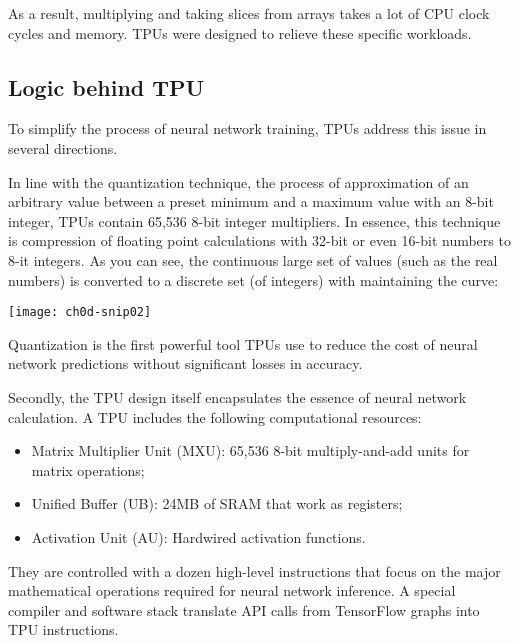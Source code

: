 As a result, multiplying and taking slices from arrays takes a lot of CPU clock cycles and memory. TPUs were designed to relieve these specific workloads.

\subsection{Logic behind TPU}

To simplify the process of neural network training, TPUs address this issue in several directions.


In line with the quantization technique, the process of approximation of an arbitrary value between a preset minimum and a maximum value with an 8-bit integer, TPUs contain 65,536 8-bit integer multipliers. In essence, this technique is compression of floating point calculations with 32-bit or even 16-bit numbers to 8-it integers. As you can see, the continuous large set of values (such as the real numbers) is converted to a discrete set (of integers) with maintaining the curve:

{\centering \texttt{[image: ch0d-snip02]} \par}

Quantization is the first powerful tool TPUs use to reduce the cost of neural network predictions without significant losses in accuracy.


Secondly, the TPU design itself encapsulates the essence of neural network calculation. A TPU includes the following computational resources:

\begin{itemize}
\item Matrix Multiplier Unit (MXU): 65,536 8-bit multiply-and-add units for matrix operations;
\item Unified Buffer (UB): 24MB of SRAM that work as registers;
\item Activation Unit (AU): Hardwired activation functions.
\end{itemize}

They are controlled with a dozen high-level instructions that focus on the major mathematical operations required for neural network inference. A special compiler and software stack translate API calls from TensorFlow graphs into TPU instructions.


